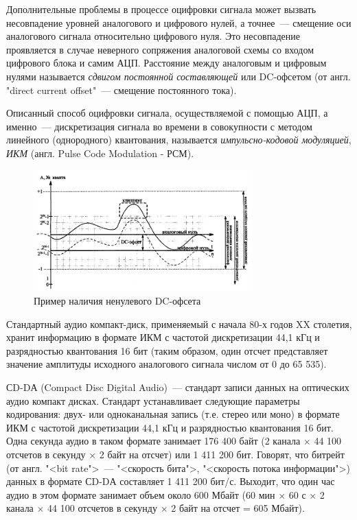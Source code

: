 \documentclass[oneside, final, 14pt]{extreport}
\begin{document}
Дополнительные проблемы в процессе оцифровки сигнала может вызвать несовпадение уровней аналогового и цифрового нулей, а точнее~--- смещение оси аналогового сигнала относительно цифрового нуля. Это несовпадение проявляется в случае неверного сопряжения аналоговой схемы со входом цифрового блока и самим АЦП. Расстояние между аналоговым и цифровым нулями называется \textit{сдвигом постоянной составляющей} или DC-офсетом (от англ. "direct current offset"~--- смещение постоянного тока). 

Описанный способ оцифровки сигнала, осуществляемой с помощью АЦП, а именно~--- дискретизация сигнала во времени в совокупности с методом линейного (однородного) квантования, называется \textit{импульсно-кодовой модуляцией}, \textit{ИКМ} (англ. Pulse Code Modulation - РСМ).

\begin{figure}[h]
\centering
\includegraphics[width=0.75\textwidth]{pic-digital-06}
\caption{Пример наличия ненулевого DC-офсета}
\label{pic-digital-06}
\end{figure}

Стандартный аудио компакт-диск, применяемый с начала 80-х годов XX столетия, хранит информацию в формате ИКМ с частотой дискретизации 44,1 кГц и разрядностью квантования 16 бит (таким образом, один отсчет представляет значение амплитуды исходного аналогового сигнала числом от 0 до 65 535).

СD-DА (Compact Disc Digital Audio)~--- стандарт записи данных на оптических аудио компакт дисках. Стандарт устанавливает следующие параметры кодирования: двух- или одноканальная запись (т.е. стерео или моно) в формате ИКМ с частотой дискретизации 44,1 кГц и разрядностью квантования 16 бит. Одна секунда аудио в таком формате занимает 176 400 байт (2 канала $\times$ 44 100 отсчетов в секунду $\times$ 2 байт на отсчет) или 1 411 200 бит. Говорят, что битрейт (от англ. "<bit rate">~--- "<скорость бита">, "<скорость потока информации">) данных в формате СD-DА составляет 1 411 200 бит/с. Выходит, что один час аудио в этом формате занимает объем около 600 Мбайт (60 мин $\times$ 60 с $\times$ 2 канала $\times$ 44 100 отсчетов в секунду $\times$ 2 байт на отсчет = 605 Мбайт).
\end{document}
